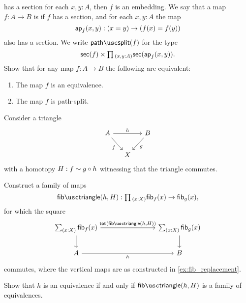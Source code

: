 \begin{exercises}
  has a section for each $x,y:A$, then $f$ is an embedding.
  \exercise \label{ex:path-split}We say that a map $f:A\to B$ is  if $f$ has a section, and for each $x,y:A$ the map
  \begin{equation*}
    \mathsf{ap}_{f}(x,y):(x=y)\to (f(x)=f(y))
  \end{equation*}
  also has a section. We write $\pathsplit(f)$ for the type
  \begin{equation*}
    \sections(f)\times\prd{x,y:A}\sections(\apfunc{f}(x,y)).
  \end{equation*}
  Show that for any map $f:A\to B$ the following are equivalent:
  \begin{enumerate}
  \item The map $f$ is an equivalence.
  \item The map $f$ is path-split.
  \end{enumerate}
  \exercise \label{ex:fiber_trans}Consider a triangle
  \begin{equation*}
    \begin{tikzcd}[column sep=small]
      A \arrow[rr,"h"] \arrow[dr,swap,"f"] & & B \arrow[dl,"g"] \\
      & X
    \end{tikzcd}
  \end{equation*}
  with a homotopy $H:f\sim g\circ h$ witnessing that the triangle commutes. 
  \begin{subexenum}
  \item Construct a family of maps
    \begin{equation*}
      \fibtriangle(h,H):\prd{x:X}\fib{f}{x}\to\fib{g}{x},
    \end{equation*}
    for which the square
    \begin{equation*}
      \begin{tikzcd}[column sep=8em]
        \sm{x:X}\fib{f}{x} \arrow[r,"\tot{\fibtriangle(h,H)}"] \arrow[d] & \sm{x:X}\fib{g}{x} \arrow[d] \\
        A \arrow[r,swap,"h"] & B
      \end{tikzcd}
    \end{equation*}
    commutes, where the vertical maps are as constructed in \cref{ex:fib_replacement}.
  \item Show that $h$ is an equivalence if and only if $\fibtriangle(h,H)$ is a family of equivalences.
  \end{subexenum}
\end{exercises}

